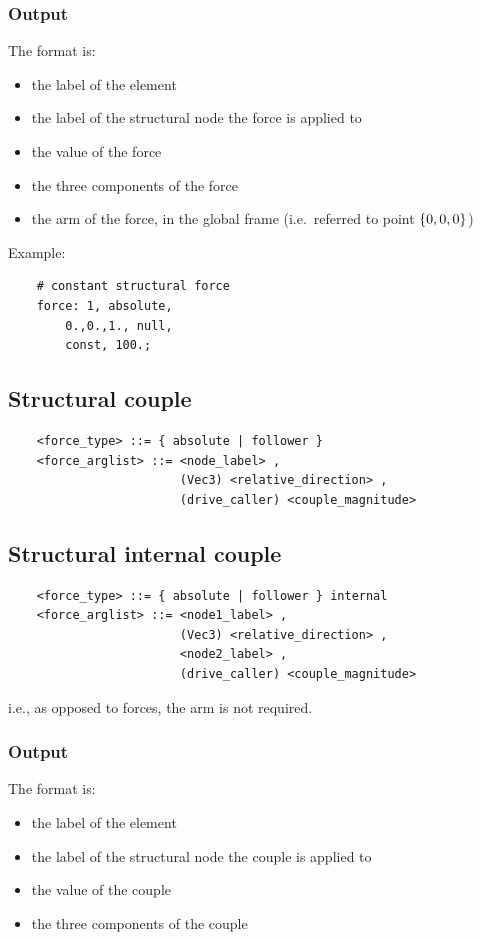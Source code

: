 \subsubsection{Output}
The format is:
\begin{itemize}
    \item the label of the element
    \item the label of the structural node the force is applied to
    \item the value of the force
    \item the three components of the force
    \item the arm of the force, in the global frame (i.e.\ referred
          to point $ \left\{ 0,0,0 \right\} $)
\end{itemize}
Example:
\begin{verbatim}
    # constant structural force
    force: 1, absolute,
        0.,0.,1., null,
        const, 100.;
\end{verbatim}


\subsection{Structural couple}
\begin{verbatim}
    <force_type> ::= { absolute | follower } 
    <force_arglist> ::= <node_label> ,
                        (Vec3) <relative_direction> ,  
                        (drive_caller) <couple_magnitude>
\end{verbatim}

\subsection{Structural internal couple}
\begin{verbatim}
    <force_type> ::= { absolute | follower } internal
    <force_arglist> ::= <node1_label> ,
                        (Vec3) <relative_direction> ,  
                        <node2_label> ,
                        (drive_caller) <couple_magnitude>
\end{verbatim}
i.e., as opposed to forces, the arm is not required. 

\subsubsection{Output}
The format is:
\begin{itemize}
    \item the label of the element
    \item the label of the structural node the couple is applied to
    \item the value of the couple
    \item the three components of the couple
\end{itemize}


